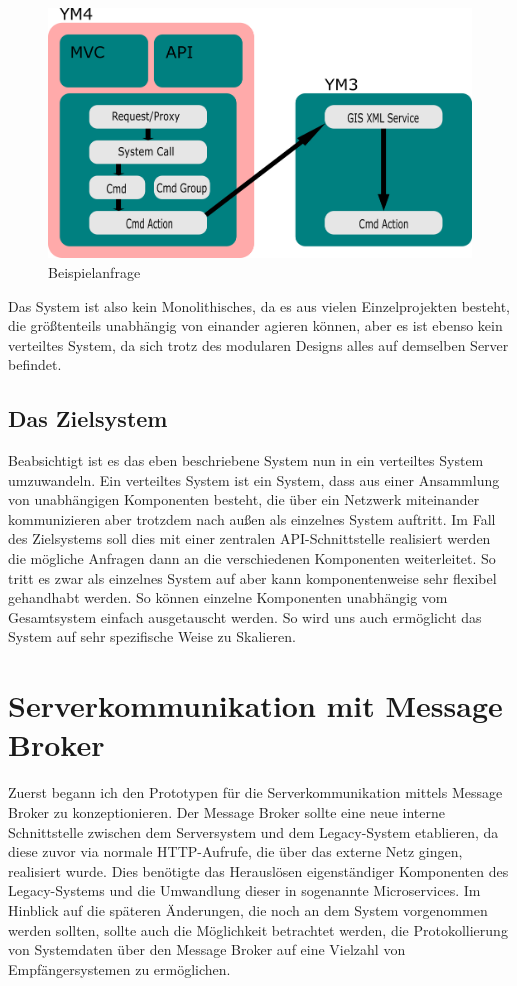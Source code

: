\documentclass[12pt,a4paper]{scrartcl}
\begin{document}
\begin{figure}[h!]
	\centering
	\includegraphics[scale=2]{YmSysReq.png}
	\caption[Selbst erstellte Grafik]{Beispielanfrage}
\end{figure}

Das System ist also kein Monolithisches, da es aus vielen Einzelprojekten besteht, die größtenteils unabhängig von einander agieren können, aber es ist ebenso kein verteiltes System, da sich trotz des modularen Designs alles auf demselben Server befindet.

\subsection{Das Zielsystem}

Beabsichtigt ist es das eben beschriebene System nun in ein verteiltes System umzuwandeln. Ein verteiltes System ist ein System, dass aus einer Ansammlung von unabhängigen Komponenten besteht, die über ein Netzwerk miteinander kommunizieren aber trotzdem nach außen als einzelnes System auftritt. Im Fall des Zielsystems soll dies mit einer zentralen API-Schnittstelle realisiert werden die mögliche Anfragen dann an die verschiedenen Komponenten weiterleitet. So tritt es zwar als einzelnes System auf aber kann komponentenweise sehr flexibel gehandhabt werden. So können einzelne Komponenten unabhängig vom Gesamtsystem einfach ausgetauscht werden. So wird uns auch ermöglicht das System auf sehr spezifische Weise zu Skalieren.

\section{Serverkommunikation mit Message Broker} \label{rabbit}
Zuerst begann ich den Prototypen für die Serverkommunikation mittels Message Broker zu konzeptionieren. Der Message Broker sollte eine neue interne Schnittstelle zwischen dem Serversystem und dem Legacy-System etablieren, da diese zuvor via normale HTTP-Aufrufe, die über das externe Netz gingen, realisiert wurde. Dies benötigte das Herauslösen eigenständiger Komponenten des Legacy-Systems und die Umwandlung dieser in sogenannte Microservices. Im Hinblick auf die späteren Änderungen, die noch an dem System vorgenommen werden sollten, sollte auch die Möglichkeit betrachtet werden, die Protokollierung von Systemdaten über den Message Broker auf eine Vielzahl von Empfängersystemen zu ermöglichen.
\end{document}
